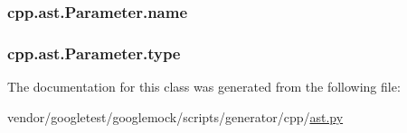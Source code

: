 \subsubsection[{\texorpdfstring{name}{name}}]{\setlength{\rightskip}{0pt plus 5cm}cpp.\+ast.\+Parameter.\+name}\hypertarget{classcpp_1_1ast_1_1Parameter_aae0375fb0ded8fa9090feea6bdff2784}{}\label{classcpp_1_1ast_1_1Parameter_aae0375fb0ded8fa9090feea6bdff2784}
\subsubsection[{\texorpdfstring{type}{type}}]{\setlength{\rightskip}{0pt plus 5cm}cpp.\+ast.\+Parameter.\+type}\hypertarget{classcpp_1_1ast_1_1Parameter_a5eed090000c41551a10c21f175ad33e3}{}\label{classcpp_1_1ast_1_1Parameter_a5eed090000c41551a10c21f175ad33e3}


The documentation for this class was generated from the following file\+:\begin{DoxyCompactItemize}
\item 
vendor/googletest/googlemock/scripts/generator/cpp/\hyperlink{ast_8py}{ast.\+py}\end{DoxyCompactItemize}
